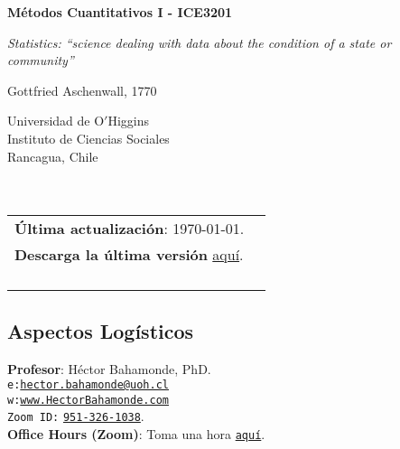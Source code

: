 \documentclass[letterpaper]{article}
\def\name{M\'etodos Cuantitativos I - ICE3201}
\begin{document}

\centerline{\huge \bf \name}

\epigraph{\emph{Statistics: ``science dealing with data about the condition of a state or community''}}{Gottfried Aschenwall, 1770}


\vspace{0.25in}

\begin{minipage}{0.45\linewidth}
 Universidad de O$'$Higgins \\
  Instituto de Ciencias Sociales \\
  Rancagua, Chile\\
  \\
  \\

\end{minipage}
\hspace{4cm}\begin{minipage}{0.45\linewidth}
  \begin{tabular}{ll}
{\bf \'Ultima actualizaci\'on}: \today. \\
 {\bf Descarga la \'ultima versi\'on} \href{https://github.com/hbahamonde/OLS/raw/master/Bahamonde_OLS.pdf}{aqu\'i}.%
    \\
    \\
    \\
    \\
    \\
  \end{tabular}
\end{minipage}

\subsection*{Aspectos Log\'isticos}


\vspace{1mm}
{\bf Profesor}: H\'ector Bahamonde, PhD.\\
\texttt{e:}\href{mailto:hector.bahamonde@uoh.cl}{\texttt{hector.bahamonde@uoh.cl}}\\
\texttt{w:}\href{http://www.hectorbahamonde.com}{\texttt{www.HectorBahamonde.com}}\\
\texttt{Zoom ID:} \href{https://us02web.zoom.us/j/9513261038?pwd=S3BSWXQxZW11NC9CRjRoMmd0TkpEZz09}{\texttt{951-326-1038}}.\\
{\bf Office Hours (Zoom)}: Toma una hora \href{https://calendly.com/bahamonde/officehours}{\texttt{aqu\'i}}.
\end{document}
